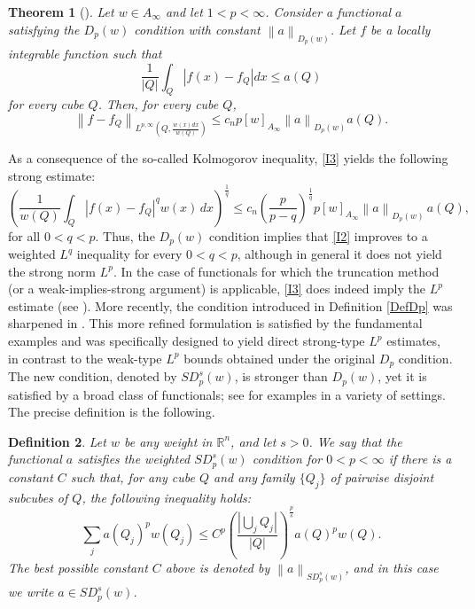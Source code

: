 \documentclass[reqno, 10pt, oneside]{amsart}
\numberwithin{equation}{section}
\newtheorem{theorem}{Theorem}
\newtheorem{definition}[theorem]{Definition}
\numberwithin{theorem}{section}
\newcommand{\R}{{\mathbb R}}
\newcommand{\1}{{\rm 1\hspace*{-0.4ex}%
\rule{0.1ex}{1.52ex}\hspace*{0.2ex}}}
\begin{document}
\begin{theorem}[\cite{FPW98,CP}] \label{Thm 1.6 CP}
		Let $w\in A_\infty$ and let $1<p<\infty$. Consider a functional $a$ satisfying the $D_p(w)$ condition with constant $\left\| a \right\|_{D_p(w)} $. Let $f$ be a locally integrable function such that
		\begin{equation*}
			\frac{1}{|Q|} \int_Q |f(x)-f_Q|dx \le a(Q)
		\end{equation*}
		for every cube $Q$. Then, for every cube $Q$,
		\begin{equation}\label{I3}
			\left\| f-f_Q\right\|_{ L^{p,\infty} \left( Q , \frac{w(x)dx}{w(Q)}\right) } \le c_n p  [w]_{A_\infty} \left\| a \right\|_{D_p(w)}  a(Q).
		\end{equation}
\end{theorem}

As a consequence of the so-called Kolmogorov inequality, \eqref{I3} yields the following strong estimate:
\begin{equation*}
	\left( \frac{1}{w(Q)} \int_Q |f(x)-f_Q|^{q} w(x)\,dx\right)^{\frac{1}{q}} 
	\le c_n \left( \frac{p}{p-q}\right)^{\frac{1}{q}} p [w]_{A_\infty} \left\| a \right\|_{D_p(w)} \, a(Q),
\end{equation*}
for all $0<q<p$. Thus, the $D_p(w)$ condition implies that \eqref{I2} improves to a weighted $L^q$ inequality for every $0<q<p$, although in general it does not yield the strong norm $L^p$. 
%
In the case of functionals for which the truncation method (or a weak-implies-strong argument) is applicable, \eqref{I3} does indeed imply the $L^p$ estimate (see \cite{KO03}).  More recently, the condition introduced in Definition \ref{DefDp} was sharpened in \cite{PR}. 
%
This more refined formulation is satisfied by the fundamental examples and was specifically designed to yield direct strong-type $L^p$ estimates, in contrast to the weak-type $L^p$ bounds obtained under the original $D_p$ condition. The new condition, denoted by $SD_p^s(w)$, is stronger than $D_p(w)$, yet it is satisfied by a broad class of functionals; see \cite{PR, CMPR, HMPV} for examples in a variety of settings.  	
The precise definition is the following. 

\begin{definition}
	Let $w$ be any weight in $\R^n$, and let $s>0$. We say that the functional $a$ satisfies the weighted $SD^s_p(w)$ condition for $0< p<\infty$ if there is a constant $C$ such that, for any cube $Q$ and any family $\{Q_j\}$ of pairwise disjoint subcubes of $Q$, the following inequality holds:
		\begin{equation*}
			\sum_j a(Q_j)^p w(Q_j)  \le C^p 
			\left(\frac{\left| \bigcup_j Q_j \right| }{|Q|} \right) ^{\frac{p}{s}}  a(Q)^p w(Q) .
		\end{equation*}
	The best possible constant $C$ above is denoted by $\left\| a \right\|_{SD_p^s(w)} $, and in this case we write $a\in  SD^s_p(w)$.
\end{definition}
\end{document}
